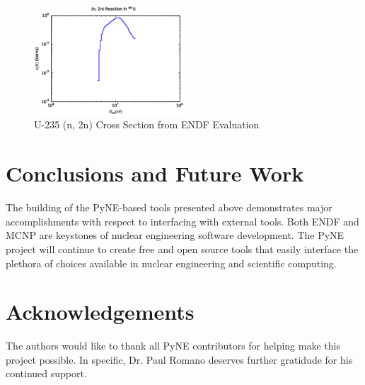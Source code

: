 \documentclass{anstrans}
\begin{document}
\begin{figure}[htbp]
  \centering
  \includegraphics[width=0.5\textwidth]{u235_2n.eps}
  \caption{U-235 (n, 2n) Cross Section from ENDF Evaluation}
  \label{u235}
\end{figure}


\section{Conclusions and Future Work}
\label{sec:conc}

The building of the PyNE-based tools presented above demonstrates major 
accomplishments with respect
to interfacing with external tools.  Both ENDF and MCNP are keystones of 
nuclear engineering software development.  The PyNE project will continue to create 
free and open source tools that easily interface the plethora of choices available 
in nuclear engineering and scientific computing. 

\section{Acknowledgements}
\label{sec:ack}

The authors would like to thank all PyNE contributors for helping make this project 
possible.  In specific, Dr. Paul Romano deserves further gratidude for his 
continued support.



\end{document}
